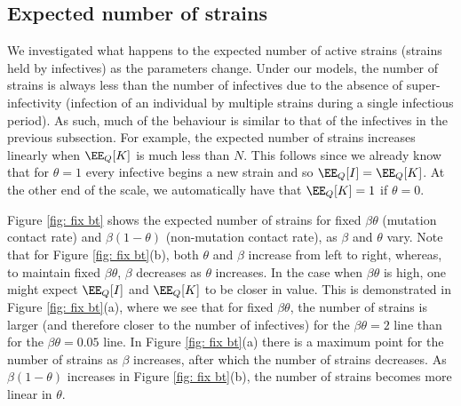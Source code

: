 \documentclass[review]{elsarticle}
\begin{document}
\subsection{Expected number of strains}\label{subsec: strains}
We investigated what happens to the expected number of active strains (strains held by infectives) as the parameters change. Under our models, the number of strains is always less than the number of infectives due to the absence of super-infectivity (infection of an individual by multiple strains during a single infectious period). As such, much of the behaviour is similar to that of the infectives in the previous subsection. For example, the expected number of strains increases linearly when $\EE_Q[K]$ is much less than $N$. This follows since we already know that for $\theta = 1$ every infective begins a new strain and so $\EE_Q[I] = \EE_Q[K]$. At the other end of the scale, we automatically have that $\EE_Q[K] = 1$ if $\theta = 0$.

Figure \ref{fig: fix bt} shows the expected number of strains for fixed $\beta\theta$ (mutation contact rate) and $\beta(1-\theta)$ (non-mutation contact rate), as $\beta$ and $\theta$ vary.  Note that for Figure \ref{fig: fix bt}(b), both $\theta$ and $\beta$ increase from left to right, whereas, to maintain fixed $\beta\theta$, $\beta$ decreases as $\theta$ increases. In the case when $\beta\theta$ is high, one might expect $\EE_Q[I]$ and $\EE_Q[K]$ to be closer in value. This is demonstrated in Figure \ref{fig: fix bt}(a), where we see that for fixed $\beta\theta$, the number of strains is larger (and therefore closer to the number of infectives) for the $\beta\theta = 2$ line than for the $\beta\theta = 0.05$ line. In Figure \ref{fig: fix bt}(a) there is a maximum point for the number of strains as $\beta$ increases, after which the number of strains decreases. As $\beta(1-\theta)$ increases in Figure \ref{fig: fix bt}(b), the number of strains becomes more linear in $\theta$. %

\end{document}
